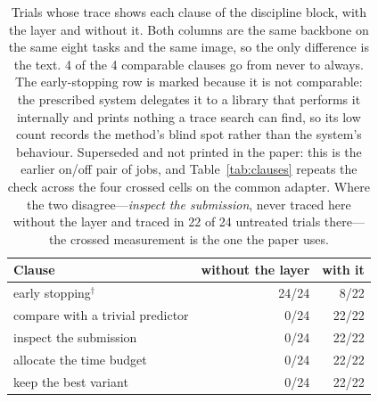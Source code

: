 \begin{table}[t]
\centering
\caption{Trials whose trace shows each clause of the discipline block, with the layer and without it. Both columns are the same backbone on the same eight tasks and the same image, so the only difference is the text. 4 of the 4 comparable clauses go from never to always. The early-stopping row is marked because it is not comparable: the prescribed system delegates it to a library that performs it internally and prints nothing a trace search can find, so its low count records the method's blind spot rather than the system's behaviour. Superseded and not printed in the paper: this is the earlier on/off pair of jobs, and Table~\ref{tab:clauses} repeats the check across the four crossed cells on the common adapter. Where the two disagree---\emph{inspect the submission}, never traced here without the layer and traced in 22 of 24 untreated trials there---the crossed measurement is the one the paper uses.}
\label{tab:discipline}
\small
\begin{tabular}{lrr}
\toprule
Clause & without the layer & with it \\
\midrule
early stopping$^{\dagger}$ & 24/24 & 8/22 \\
compare with a trivial predictor & 0/24 & 22/22 \\
inspect the submission & 0/24 & 22/22 \\
allocate the time budget & 0/24 & 22/22 \\
keep the best variant & 0/24 & 22/22 \\
\bottomrule
\end{tabular}
\end{table}
